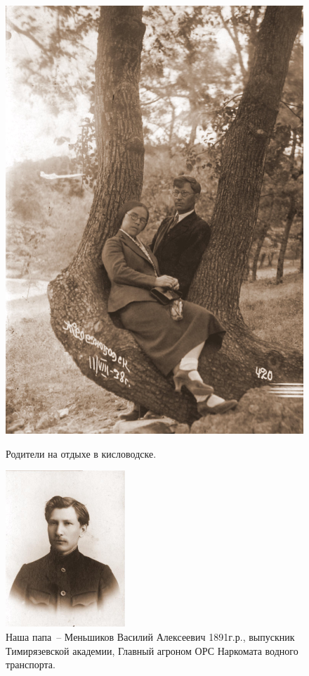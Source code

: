 \documentclass[utf8x, 10pt]{G7-32} %
\begin{document}
\begin{figure}[h!]
\begin{minipage}[h]{70mm}
       \includegraphics[width=\linewidth]{inc/Menshekovy/12.jpg} 
       \caption{Родители на отдыхе в кисловодске.}
   \end{minipage}
   \hfill
    \begin{minipage}[h!]{50mm}
        \begin{center}
        \includegraphics[width=45mm]{inc/Menshekovy/13a.JPG}
        \end{center}
        \caption{Наша папа~-- Меньшиков Василий Алексеевич 1891г.р., выпускник Тимирязевской академии, Главный агроном ОРС Наркомата водного транспорта.}
    \end{minipage}

\end{figure}
\end{document}
